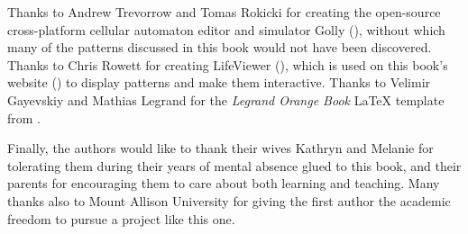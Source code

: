 Thanks to Andrew Trevorrow and Tomas Rokicki for creating the open-source cross-platform cellular automaton editor and simulator Golly (), without which many of the patterns discussed in this book would not have been discovered. Thanks to Chris Rowett for creating LifeViewer (), which is used on this book's website () to display patterns and make them interactive. Thanks to Velimir Gayevskiy and Mathias Legrand for the \emph{Legrand Orange Book} LaTeX template from .

Finally, the authors would like to thank their wives Kathryn and Melanie for tolerating them during their years of mental absence glued to this book, and their parents for encouraging them to care about both learning and teaching. Many thanks also to Mount Allison University for giving the first author the academic freedom to pursue a project like this one.
